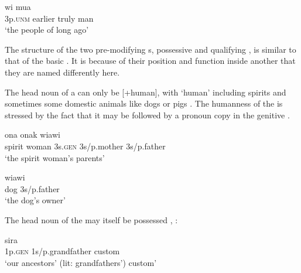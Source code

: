\ea%
\label{ex:4:x1883}
\gll wi  {\ob}   mua \\
  3p.\textsc{unm}  earlier  truly  man    \\
\glt`the people of long ago'
\z

The structure of the two pre-modifying s, possessive  and qualifying , is similar to that of the basic . It is because of their position and function inside another  that they are named differently here.

The head noun of a 
 can only be [+human], with `human' including spirits  and sometimes some domestic animals like dogs or pigs . The humanness of the  is stressed by the fact that it may be followed by a pronoun copy in the genitive .

\ea%
\label{ex:4:x402}
\gll {}   ona  onak  wiawi \\
    spirit  woman  3s.\textsc{gen}  3s/p.mother  3s/p.father  \\
\glt`the spirit woman's parents'

\z

\ea%
\label{ex:4:x403}
\gll {}  wiawi \\
  dog  3s/p.father    \\
\glt`the dog's owner'
\z

The head noun of the  may itself be possessed , :

\ea%
\label{ex:4:x404}
\gll {}   sira \\
 1p.\textsc{gen}  1s/p.grandfather  custom     \\
\glt`our ancestors' (lit: grandfathers') custom'
\z

